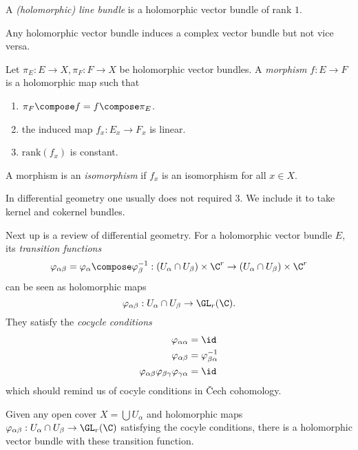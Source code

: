 \documentclass[a4paper]{article}
\begin{document}
\begin{definition}
  A \emph{(holomorphic) line bundle} is a holomorphic vector bundle of rank \(1\).
\end{definition}

Any holomorphic vector bundle induces a complex vector bundle but not vice versa.

\begin{definition}
  Let \(\pi_E: E \to X, \pi_F: F \to X\) be holomorphic vector bundles. A \emph{morphism} \(f: E \to F\) is a holomorphic map such that
  \begin{enumerate}
  \item \(\pi_F \compose f = f \compose \pi_E\).
  \item the induced map \(f_x: E_x \to F_x\) is linear.
  \item \(\text{rank}(f_x)\) is constant.
  \end{enumerate}

  A morphism is an \emph{isomorphism} if \(f_x\) is an isomorphism for all \(x \in X\).
\end{definition}

\begin{remark}
  In differential geometry one usually does not required 3. We include it to take kernel and cokernel bundles.
\end{remark}

Next up is a review of differential geometry. For a holomorphic vector bundle \(E\), its \emph{transition functions}
\[
  \varphi_{\alpha\beta} = \varphi_\alpha \compose \varphi_\beta^{-1}: (U_\alpha \cap U_\beta) \times \C^r \to (U_\alpha \cap U_\beta) \times \C^r 
\]
can be seen as holomorphic maps
\[
  \varphi_{\alpha\beta}: U_\alpha \cap U_\beta \to \GL_r(\C).
\]
They satisfy the \emph{cocycle conditions}
\begin{align*}
  \varphi_{\alpha\alpha} &= \id \\
  \varphi_{\alpha\beta} &= \varphi_{\beta\alpha}^{-1} \\
  \varphi_{\alpha\beta} \varphi_{\beta\gamma} \varphi_{\gamma\alpha} &= \id
\end{align*}
which should remind us of cocyle conditions in Čech cohomology.

\begin{proposition}
  Given any open cover \(X = \bigcup U_\alpha\) and holomorphic maps \(\varphi_{\alpha\beta}: U_\alpha \cap U_\beta \to \GL_r(\C)\) satisfying the cocyle conditions, there is a holomorphic vector bundle with these transition function.
\end{proposition}
\end{document}
